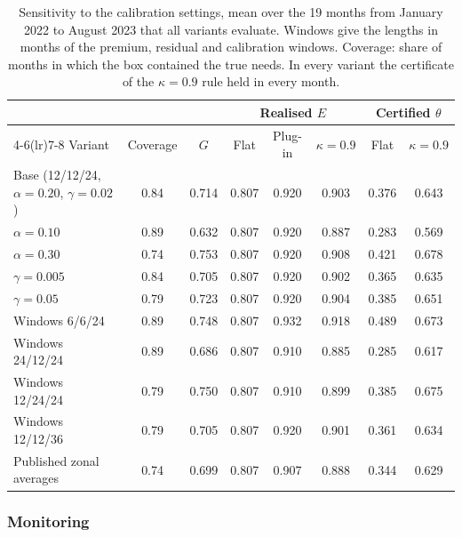 \documentclass[preprint,12pt,number]{elsarticle}%
\theoremstyle{definition}
\theoremstyle{remark}
\begin{document}
\begin{table}[t]
\centering
\caption{Sensitivity to the calibration settings, mean over the 19 months from January 2022 to August 2023 that all variants evaluate. Windows give the lengths in months of the premium, residual and calibration windows. Coverage: share of months in which the box contained the true needs. In every variant the certificate of the $\kappa=0.9$ rule held in every month.}\label{tab:sensitivity}
\small
\begin{tabular}{lccccccc}
\toprule
 & & & \multicolumn{3}{c}{Realised $E$} & \multicolumn{2}{c}{Certified $\theta$}\\
\cmidrule(lr){4-6}\cmidrule(lr){7-8}
Variant & Coverage & $G$ & Flat & Plug-in & $\kappa=0.9$ & Flat & $\kappa=0.9$\\
\midrule
Base (12/12/24, $\alpha=0.20$, $\gamma=0.02$) & 0.84 & 0.714 & 0.807 & 0.920 & 0.903 & 0.376 & 0.643\\
$\alpha=0.10$ & 0.89 & 0.632 & 0.807 & 0.920 & 0.887 & 0.283 & 0.569\\
$\alpha=0.30$ & 0.74 & 0.753 & 0.807 & 0.920 & 0.908 & 0.421 & 0.678\\
$\gamma=0.005$ & 0.84 & 0.705 & 0.807 & 0.920 & 0.902 & 0.365 & 0.635\\
$\gamma=0.05$ & 0.79 & 0.723 & 0.807 & 0.920 & 0.904 & 0.385 & 0.651\\
Windows 6/6/24 & 0.89 & 0.748 & 0.807 & 0.932 & 0.918 & 0.489 & 0.673\\
Windows 24/12/24 & 0.89 & 0.686 & 0.807 & 0.910 & 0.885 & 0.285 & 0.617\\
Windows 12/24/24 & 0.79 & 0.750 & 0.807 & 0.910 & 0.899 & 0.385 & 0.675\\
Windows 12/12/36 & 0.79 & 0.705 & 0.807 & 0.920 & 0.901 & 0.361 & 0.634\\
Published zonal averages & 0.74 & 0.699 & 0.807 & 0.907 & 0.888 & 0.344 & 0.629\\
\bottomrule
\end{tabular}
\end{table}


\subsubsection{Monitoring}
\end{document}
